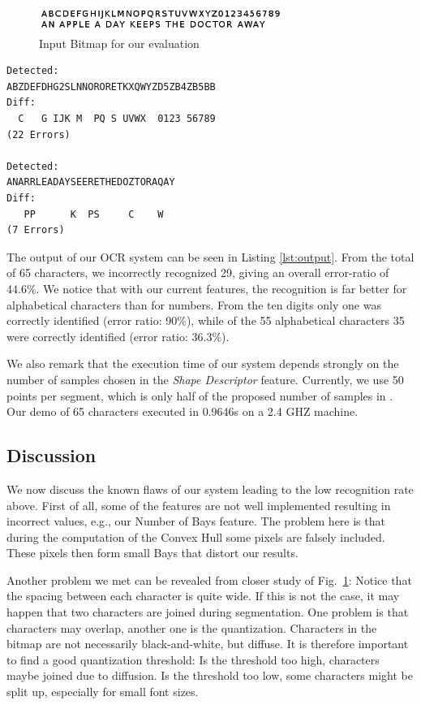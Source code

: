 \documentclass{article}
\begin{document}
\begin{figure}[ht]
 \includegraphics[width=8cm]{images/demo.png}
 \caption{Input Bitmap for our evaluation}
 \label{fig:input}
\end{figure}

\begin{lstlisting}[caption={Result of our evaluation},label={lst:output}]
Detected: 
ABZDEFDHG2SLNNORORETKXQWYZD5ZB4ZB5BB
Diff:
  C   G IJK M  PQ S UVWX  0123 56789
(22 Errors)

Detected:
ANARRLEADAYSEERETHEDOZTORAQAY
Diff:
   PP      K  PS     C    W  
(7 Errors)
\end{lstlisting}

The output of our OCR system can be seen in Listing \ref{lst:output}. From the total of 65 characters, we incorrectly recognized 29, giving an overall error-ratio of 44.6\%.
We notice that with our current features, the recognition is far better for alphabetical characters than for numbers. From the ten digits only one was correctly identified (error ratio: 90\%), while of the 55 alphabetical characters 35 were correctly identified (error ratio: 36.3\%). 


We also remark that the execution time of our system depends strongly on the number of samples chosen in the \textit{Shape Descriptor} feature. Currently, we use 50 points per segment, which is only half of the proposed number of samples in \cite{Belongie00shapecontext:}. Our demo of 65 characters executed in 0.9646s on a 2.4 GHZ machine.

\subsection{Discussion}
We now discuss the known flaws of our system leading to the low recognition rate above. First of all, some of the features are not well implemented resulting in incorrect values, e.g., our Number of Bays feature. The problem here is that during the computation of the Convex Hull some pixels are falsely included. These pixels then form small Bays that distort our results.

Another problem we met can be revealed from closer study of Fig.~\ref{fig:input}: Notice that the spacing between each character is quite wide. If this is not the case, it may happen that two characters are joined during segmentation. One problem is that characters may overlap, another one is the quantization. Characters in the bitmap are not necessarily black-and-white, but diffuse. It is therefore important to find a good quantization threshold: Is the threshold too high, characters maybe joined due to diffusion. Is the threshold too low, some characters might be split up, especially for small font sizes.
\end{document}
